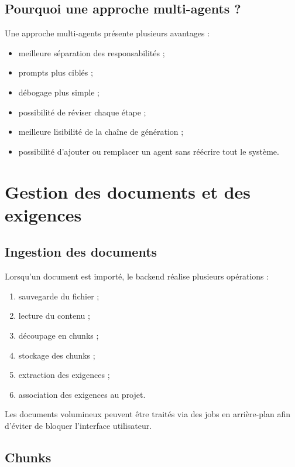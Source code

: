 \documentclass[
  french,
]{report}
\providecommand{\tightlist}{%
  \setlength{\itemsep}{0pt}\setlength{\parskip}{0pt}}
\begin{document}
\section{Pourquoi une approche multi-agents
?}\label{pourquoi-une-approche-multi-agents}

Une approche multi-agents présente plusieurs avantages :

\begin{itemize}
\tightlist
\item
  meilleure séparation des responsabilités ;
\item
  prompts plus ciblés ;
\item
  débogage plus simple ;
\item
  possibilité de réviser chaque étape ;
\item
  meilleure lisibilité de la chaîne de génération ;
\item
  possibilité d'ajouter ou remplacer un agent sans réécrire tout le
  système.
\end{itemize}

\chapter{Gestion des documents et des
exigences}\label{gestion-des-documents-et-des-exigences}

\section{Ingestion des documents}\label{ingestion-des-documents}

Lorsqu'un document est importé, le backend réalise plusieurs opérations
:

\begin{enumerate}
\def\labelenumi{\arabic{enumi}.}
\tightlist
\item
  sauvegarde du fichier ;
\item
  lecture du contenu ;
\item
  découpage en chunks ;
\item
  stockage des chunks ;
\item
  extraction des exigences ;
\item
  association des exigences au projet.
\end{enumerate}

Les documents volumineux peuvent être traités via des jobs en
arrière-plan afin d'éviter de bloquer l'interface utilisateur.

\section{Chunks}\label{chunks}
\end{document}
